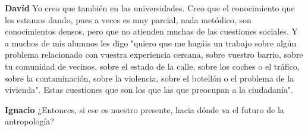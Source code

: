 \documentclass[
  spanish,
  11pt,
  a4paper,
]{scrbook}
\newenvironment{transcripcion}{
    \begin{list}{}{
        \setlength{\leftmargin}{1.5em}  %
        \setlength{\rightmargin}{0em}
        \setlength{\itemsep}{0.2em}     %
        \setlength{\parsep}{0.0em}
        \setlength{\listparindent}{0pt}
    }
}{
    \end{list}
}
\newcommand{\personaje}[1]{\textbf{#1}\quad}
\begin{document}
\begin{transcripcion}
\item \personaje{Davíd} Yo creo que también en las universidades. Creo que el conocimiento que les estamos dando, pues a veces es muy parcial, nada metódico, son conocimientos densos, pero que no atienden muchas de las cuestiones sociales. Y a muchos de mis alumnos les digo "quiero que me hagáis un trabajo sobre algún problema relacionado con vuestra experiencia cercana, sobre vuestro barrio, sobre tu comunidad de vecinos, sobre el estado de la calle, sobre los coches o el tráfico, sobre la contaminación, sobre la violencia, sobre el botellón o el problema de la vivienda". Estas cuestiones que son los que las que preocupan a la ciudadanía".

\item \personaje{Ignacio} ¿Entonces, si ese es nuestro presente, hacia dónde va el futuro de la antropología?


\end{transcripcion}
\end{document}
